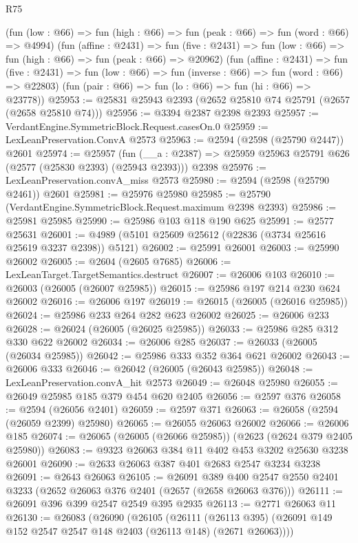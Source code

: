 \begin{lexlean}{R75}
\begin{coremodule}
      (fun (low : @66) => fun (high : @66) => fun (peak : @66) => fun (word : @66) => @4994)
      (fun (affine : @2431) =>
      fun (five : @2431) => fun (low : @66) => fun (high : @66) => fun (peak : @66) => @20962)
      (fun (affine : @2431) =>
      fun (five : @2431) => fun (low : @66) => fun (inverse : @66) => fun (word : @66) => @22803)
      (fun (pair : @66) => fun (lo : @66) => fun (hi : @66) => @23778))
@25953 := @25831 @25943 @2393 (@2652 @25810 @74 @25791 (@2657 (@2658 @25810 @74)))
@25956 := @3394 @2387 @2398 @2393
@25957 := VerdantEngine.SymmetricBlock.Request.casesOn.{0}
@25959 := LexLeanPreservation.ConvA @2573
@25963 := @2594 (@2598 (@25790 @2447)) @2601
@25974 := @25957
    (fun (__a : @2387) => @25959 @25963 @25791 @626 (@2577 (@25830 @2393) (@25943 @2393)))
    @2398
@25976 := LexLeanPreservation.convA_miss @2573
@25980 := @2594 (@2598 (@25790 @2461)) @2601
@25981 := @25976 @25980
@25985 := @25790 (VerdantEngine.SymmetricBlock.Request.maximum @2398 @2393)
@25986 := @25981 @25985
@25990 := @25986 @103 @118 @190 @625
@25991 := @2577 @25631
@26001 := @4989 (@5101 @25609 @25612 (@22836 (@3734 @25616 @25619 @3237 @2398)) @5121)
@26002 := @25991 @26001
@26003 := @25990 @26002
@26005 := @2604 (@2605 @7685)
@26006 := LexLeanTarget.TargetSemantics.destruct
@26007 := @26006 @103
@26010 := @26003 (@26005 (@26007 @25985))
@26015 := @25986 @197 @214 @230 @624 @26002
@26016 := @26006 @197
@26019 := @26015 (@26005 (@26016 @25985))
@26024 := @25986 @233 @264 @282 @623 @26002
@26025 := @26006 @233
@26028 := @26024 (@26005 (@26025 @25985))
@26033 := @25986 @285 @312 @330 @622 @26002
@26034 := @26006 @285
@26037 := @26033 (@26005 (@26034 @25985))
@26042 := @25986 @333 @352 @364 @621 @26002
@26043 := @26006 @333
@26046 := @26042 (@26005 (@26043 @25985))
@26048 := LexLeanPreservation.convA_hit @2573
@26049 := @26048 @25980
@26055 := @26049 @25985 @185 @379 @454 @620 @2405
@26056 := @2597 @376
@26058 := @2594 (@26056 @2401)
@26059 := @2597 @371
@26063 := @26058 (@2594 (@26059 @2399) @25980)
@26065 := @26055 @26063 @26002
@26066 := @26006 @185
@26074 := @26065 (@26005 (@26066 @25985)) (@2623 (@2624 @379 @2405 @25980))
@26083 := @9323 @26063 @384 @11 @402 @453 @3202 @25630 @3238 @26001
@26090 := @2633 @26063 @387 @401 @2683 @2547 @3234 @3238
@26091 := @2643 @26063
@26105 := @26091
    @389
    @400
    @2547
    @2550
    @2401
    @3233
    (@2652 @26063 @376 @2401 (@2657 (@2658 @26063 @376)))
@26111 := @26091 @396 @399 @2547 @2549 @395 @2935
@26113 := @2771 @26063 @11
@26130 := @26083
    (@26090
      (@26105
        (@26111
          (@26113 @395)
          (@26091 @149 @152 @2547 @2547 @148 @2403 (@26113 @148) (@2671 @26063))))

\end{coremodule}
\end{lexlean}
